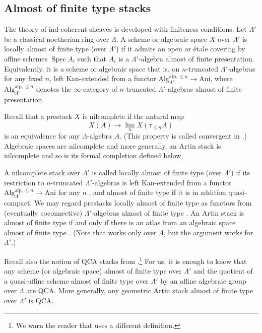 \documentclass{amsart}
\theoremstyle{definition}
\theoremstyle{remark}
\numberwithin{equation}{section}
\DeclareMathOperator{\Spec}{Spec}
\newcommand{\Alg}{\mathrm{Alg}}
\newcommand{\Ani}{\mathrm{Ani}}
\newcommand{\afp}{\mathrm{afp}}
\begin{document}
\subsection{Almost of finite type stacks}
The theory of ind-coherent sheaves is developed with finiteness conditions. Let $\Lambda'$ be a classical noetherian ring over $\Lambda$. A scheme or algebraic space $X$ over $\Lambda'$ is locally almost of finite type (over $\Lambda'$) if it admits an open or \'etale covering by affine schemes $\Spec A_i$ such that $A_i$ is a $\Lambda'$-algebra almost of finite presentation. Equivalently, it is a scheme or algebraic space that is, on $n$-truncated $\Lambda'$-algebras for any fixed $n$, left Kan-extended from a functor $\Alg_{\Lambda'}^{\afp, \leq n}\to \Ani$, where $\Alg_{\Lambda'}^{\afp, \leq n}$ denotes the $\infty$-category of $n$-truncated $\Lambda'$-algebras almost of finite presentation. 

Recall that a prestack $X$ is nilcomplete if the natural map
\[
X(A) \to \lim_n X(\tau_{\leq n}A ) 
\]
is an equivalence for any $\Lambda$-algebra $A$. (This property is called convergent in \cite{GRI, DrinfeldGaitsgory}.) Algebraic spaces are nilcomplete and more generally, an Artin stack is nilcomplete \cite[Proposition 2.4.4.9]{GRI} and so is its formal completion defined below.

A nilcomplete stack over $\Lambda'$ is called locally almost of finite type (over $\Lambda'$) if its restriction to $n$-truncated $\Lambda'$-algebras is left Kan-extended from a functor $\Alg_{\Lambda'}^{\afp, \leq n}\to \Ani$ for any $n$ \cite[\S 2.1.7.2]{GRI}, and almost of finite type if it is in addition quasi-compact. We may regard prestacks locally almost of finite type as functors from (eventually coconnective) $\Lambda'$-algebras almost of finite type \cite[Proposition 2.1.7.6]{GRI}. An Artin stack is almost of finite type if and only if there is an atlas from an algebraic space almost of finite type \cite[Proposition 2.4.5.2]{GRI}. (Note that \cite{GRI} works only over $\Lambda$, but the argument works for $\Lambda'$.)


Recall also the notion of QCA stacks from \cite[Definition 1.1.8]{DrinfeldGaitsgory}.\footnote{We warn the reader that \cite[Definition 2.6.1]{HansenMann} uses a different definition.} For us, it is enough to know that any scheme (or algebraic space) almost of finite type over $\Lambda'$ and the quotient of a quasi-affine scheme almost of finite type over $\Lambda'$ by an affine algebraic group over $\Lambda$ are QCA. More generally, any geometric Artin stack almost of finite type over $\Lambda'$ is QCA. 
\end{document}
